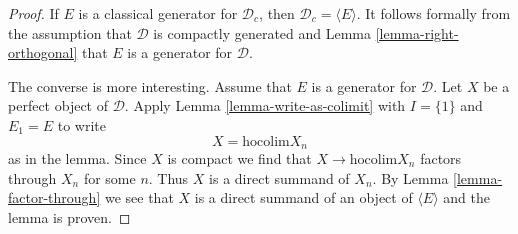 \begin{proof}
If $E$ is a classical generator for $\mathcal{D}_c$, then
$\mathcal{D}_c = \langle E \rangle$. It follows formally
from the assumption that $\mathcal{D}$ is compactly generated
and Lemma \ref{lemma-right-orthogonal} that $E$ is a generator
for $\mathcal{D}$.

\medskip\noindent
The converse is more interesting. Assume that $E$ is a generator
for $\mathcal{D}$. Let $X$ be a perfect object of $\mathcal{D}$.
Apply Lemma \ref{lemma-write-as-colimit} with $I = \{1\}$ and
$E_1 = E$ to write
$$
X = \text{hocolim} X_n
$$
as in the lemma. Since $X$ is compact we
find that $X \to \text{hocolim} X_n$ factors through $X_n$ for
some $n$. Thus $X$ is a direct summand of $X_n$.
By Lemma \ref{lemma-factor-through} we see that $X$ is a direct summand of an
object of $\langle E \rangle$ and the lemma is proven.
\end{proof}














